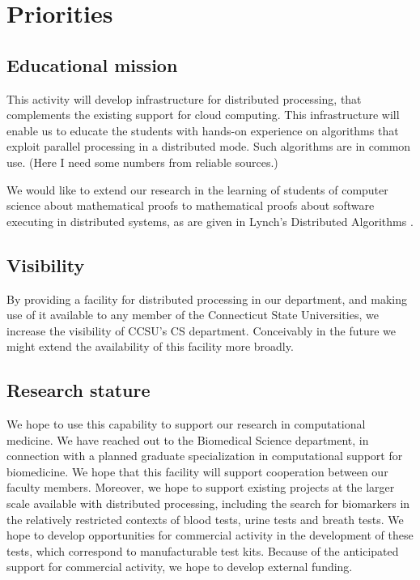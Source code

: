 \documentclass[]{article}
\title{}
\author{}
\begin{document}
\maketitle



\section{Priorities}
\subsection{Educational mission}
This activity will  develop infrastructure for distributed processing, that complements the existing support for cloud computing. This infrastructure will enable us to educate the students with hands-on experience on algorithms that exploit parallel processing in a distributed mode. Such algorithms are in common use. (Here I need some numbers from reliable sources.)

We would like to extend our research in the learning of students of computer science about mathematical proofs \cite{smith2013mathematization,smith2014computer,smith2016categories} to mathematical proofs about software executing in distributed systems, as are given in Lynch's Distributed Algorithms \cite{lynch1996distributed}.
\subsection{Visibility}
By providing a facility for distributed processing in our department, and making use of it available to any member of the Connecticut State Universities, we increase the visibility of CCSU's CS department. Conceivably in the future we might extend the availability of this facility more broadly.
\subsection{Research stature}
We hope to use this capability to support our research in computational medicine. We have reached out to the Biomedical Science department, in connection with a planned graduate specialization in computational support for biomedicine. We hope that this facility will support cooperation between our faculty members. Moreover, we hope to support existing projects at the larger scale available with distributed processing, including the search for biomarkers in the relatively restricted contexts of blood tests, urine tests and breath tests. We hope to develop opportunities for commercial activity in the development of these tests, which correspond to manufacturable test kits. Because of the anticipated support for commercial activity, we hope to develop external funding.
\end{document}
